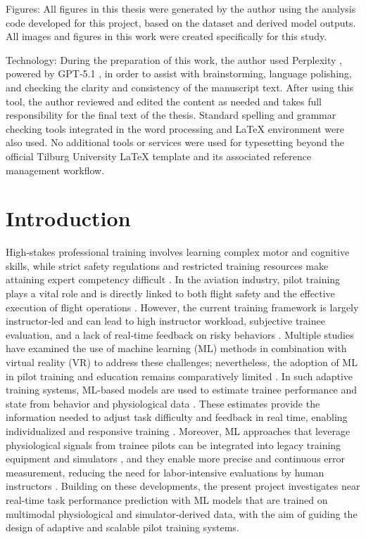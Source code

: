 \documentclass[11pt, a4paper]{article}
\begin{document}
Figures:
All figures in this thesis were generated by the author using the analysis code developed for this project, based on the dataset and derived model outputs. All images and figures in this work were created specifically for this study.

Technology:
During the preparation of this work, the author used Perplexity \cite{perplexity-ai-2026}, powered by GPT‑5.1 \cite{openai-2025}, in order to assist with brainstorming, language polishing, and checking the clarity and consistency of the manuscript text. After using this tool, the author reviewed and edited the content as needed and takes full responsibility for the final text of the thesis. Standard spelling and grammar checking tools integrated in the word processing and LaTeX environment were also used. No additional tools or services were used for typesetting beyond the official Tilburg University LaTeX template and its associated reference management workflow.

\section{Introduction} \label{sec:introduction}
High‑stakes professional training involves learning complex motor and cognitive skills, while strict safety regulations and restricted training resources make attaining expert competency difficult \cite{nassar-2021}. In the aviation industry, pilot training plays a vital role and is directly linked to both flight safety and the effective execution of flight operations \cite{yang-2021}. However, the current training framework is largely instructor‑led and can lead to high instructor workload, subjective trainee evaluation, and a lack of real‑time feedback on risky behaviors \cite{yang-2021}. Multiple studies have examined the use of machine learning (ML) methods in combination with virtual reality (VR) to address these challenges; nevertheless, the adoption of ML in pilot training and education remains comparatively limited \cite{caballero-2023}. In such adaptive training systems, ML-based models are used to estimate trainee performance and state from behavior and physiological data \cite{madrigal-cerezo-2026}. These estimates provide the information needed to adjust task difficulty and feedback in real time, enabling individualized and responsive training \cite{madrigal-cerezo-2026}. Moreover, ML approaches that leverage physiological signals from trainee pilots can be integrated into legacy training equipment and simulators \cite{caballero-2023}, and they enable more precise and continuous error measurement, reducing the need for labor‑intensive evaluations by human instructors \cite{barry-2025}. Building on these developments, the present project investigates near real‑time task performance prediction with ML models that are trained on multimodal physiological and simulator‑derived data, with the aim of guiding the design of adaptive and scalable pilot training systems.
\end{document}
